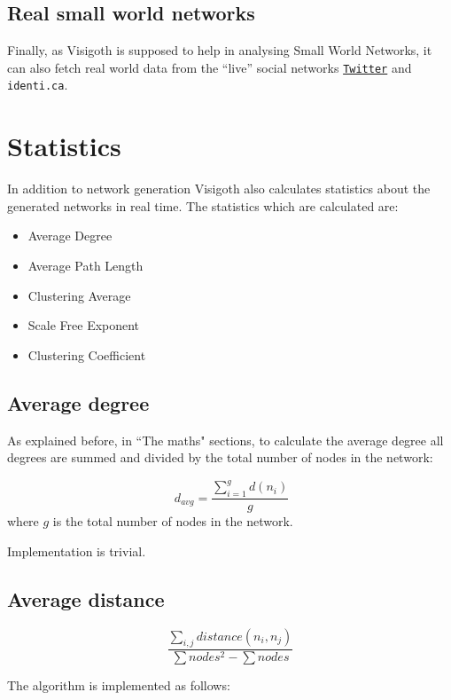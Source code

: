 \documentclass[a4paper,11pt,titlepage]{article}
\let\stdhref\href
\renewcommand{\href}[2]{\stdhref{#1}{\texttt{#2}}}
\let\stdsection\section         %
\renewcommand{\section}{\newpage\stdsection}
\newcommand{\Twitter}{\href{http://twitter.com}{Twitter} }
\begin{document}
\subsection{Real small world networks}
Finally, as Visigoth is supposed to help in analysing Small World
Networks, it can also fetch real world data from the ``live'' social
networks \Twitter and \texttt{identi.ca}.



\section{Statistics}
In addition to network generation Visigoth also calculates statistics about the
generated networks in real time. The statistics which are calculated are:

\begin{itemize}
  \item Average Degree
  \item Average Path Length
  \item Clustering Average
  \item Scale Free Exponent
  \item Clustering Coefficient
\end{itemize}


\subsection{Average degree}

As explained before, in ``The maths" sections, to calculate the
average degree all degrees are summed and divided by the total number
of nodes in the network:

\begin{equation}
\ d_{avg} =\frac{\sum_{i=1}^gd(n_i)}{g}
\end{equation}
where \(g\) is the total number of nodes in the network.

Implementation is trivial.


\subsection{Average distance}
\[ \frac{\sum_{i,j}distance(n_i,n_j)}
        {\sum nodes^2 - \sum nodes}
\]

The algorithm is implemented as follows:
\end{document}
